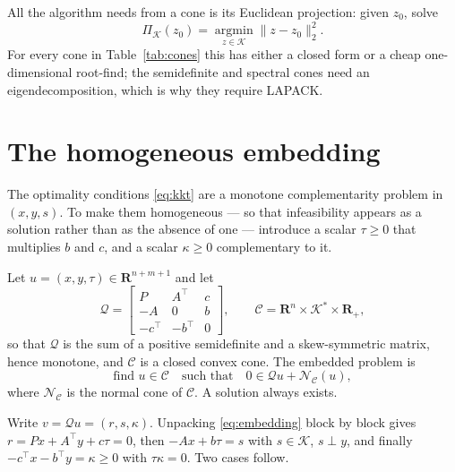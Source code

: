 \documentclass[11pt,a4paper]{article}
\newcommand{\R}{\mathbf{R}}
\newcommand{\K}{\mathcal{K}}
\newcommand{\C}{\mathcal{C}}
\newcommand{\Q}{\mathcal{Q}}
\newcommand{\N}{\mathcal{N}}
\newcommand{\proj}[1]{\Pi_{#1}}
\newcommand{\tr}{^\top}
\theoremstyle{plain}
\begin{document}
All the algorithm needs from a cone is its Euclidean projection: given $z_0$,
solve
\begin{equation}\label{eq:coneproj}
\proj{\K}(z_0) = \operatorname*{argmin}_{z \in \K} \|z - z_0\|_2^2 .
\end{equation}
For every cone in Table~\ref{tab:cones} this has either a closed form or a
cheap one-dimensional root-find; the semidefinite and spectral cones need an
eigendecomposition, which is why they require LAPACK.

\section{The homogeneous embedding}\label{sec:embedding}

The optimality conditions \eqref{eq:kkt} are a monotone complementarity problem
in $(x,y,s)$. To make them homogeneous --- so that infeasibility appears as a
solution rather than as the absence of one --- introduce a scalar
$\tau \geq 0$ that multiplies $b$ and $c$, and a scalar $\kappa \geq 0$
complementary to it.

Let $u = (x, y, \tau) \in \R^{n+m+1}$ and let
\begin{equation}\label{eq:Q}
\Q = \begin{bmatrix} P & A\tr & c \\ -A & 0 & b \\ -c\tr & -b\tr & 0
     \end{bmatrix},
\qquad
\C = \R^n \times \K^* \times \R_+ ,
\end{equation}
so that $\Q$ is the sum of a positive semidefinite and a skew-symmetric matrix,
hence monotone, and $\C$ is a closed convex cone. The embedded problem is
\begin{equation}\label{eq:embedding}
\text{find } u \in \C \quad\text{such that}\quad 0 \in \Q u + \N_\C(u),
\end{equation}
where $\N_\C$ is the normal cone of $\C$. A solution always exists.

Write $v = \Q u = (r, s, \kappa)$. Unpacking \eqref{eq:embedding} block by
block gives $r = Px + A\tr y + c\tau = 0$, then $-Ax + b\tau = s$ with
$s \in \K$, $s \perp y$, and finally $-c\tr x - b\tr y = \kappa \geq 0$ with
$\tau \kappa = 0$. Two cases follow.
\end{document}
